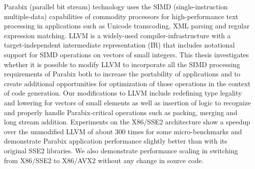 
%
%


Parabix (parallel bit stream) technology uses the SIMD (single-instruction
multiple-data) capabilities of commodity processors for high-performance
text processing in applications such as Unicode transcoding, XML parsing
and regular expression matching.   LLVM is a widely-used compiler-infrastructure
with a target-independent intermediate representation (IR) that includes
notational support for SIMD operations on vectors of small integers.
This thesis investigates whether it is possible to modify LLVM to
incorporate all the SIMD processing requirements of Parabix both to
increase the portability of applications and to create
additional opportunities for optimization of those operations in the
context of code generation.   Our modifications to LLVM include
redefining type legality and lowering for vectors of small elements
as well as insertion of logic to recognize and properly handle Parabix-critical
operations such as packing, merging and long stream addition.
Experiments on the X86/SSE2 architecture show a speedup over the unmodified
LLVM of about 300 times for some micro-benchmarks and demonstrate
Parabix application performance slightly better than with its original
SSE2 libraries. We also demonstrate performance scaling in switching
from X86/SSE2 to X86/AVX2 without any change in source code.
